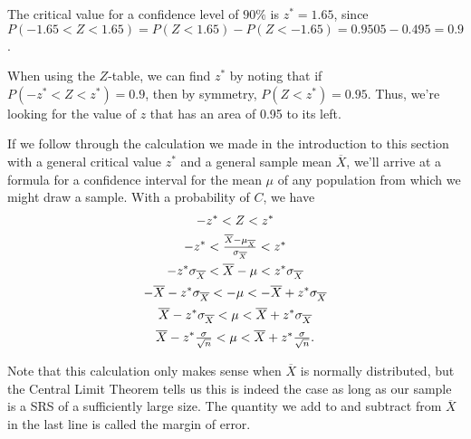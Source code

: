 \begin{examp}
The critical value for a confidence level of $90\%$ is $z^* = 1.65$, since $P(-1.65 < Z < 1.65) = P(Z < 1.65) - P(Z < -1.65) = 0.9505 - 0.495 = 0.9$.
\begin{center}
\end{center}
When using the $Z$-table, we can find $z^*$ by noting that if $P(-z^* < Z < z^*) = 0.9$, then by symmetry, $P(Z < z^*) = 0.95$. Thus, we're looking for the value of $z$ that has an area of 0.95 to its left.
\end{examp}
\par
If we follow through the calculation we made in the introduction to this section with a general critical value $z^*$ and a general sample mean $\overline{X}$, we'll arrive at a formula for a confidence interval for the mean $\mu$ of any population from which we might draw a sample. With a probability of $C$, we have
\begin{gather*}
-z^* < Z < z^* \\
-z^* < \textstyle\frac{\overline{X}- \mu_{\overline{X}}}{\sigma_{\overline{X}}} < z^* \\
-z^* \sigma_{\overline{X}} < \overline{X}- \mu < z^* \sigma_{\overline{X}} \\[0.2ex]
-\overline{X}-z^* \sigma_{\overline{X}} < - \mu < -\overline{X}+z^* \sigma_{\overline{X}} \\[0.3ex]
\overline{X}-z^* \sigma_{\overline{X}} <  \mu < \overline{X}+z^* \sigma_{\overline{X}} \\[0.3ex]
\overline{X}-z^* \textstyle\frac{\sigma}{\sqrt{n}} <  \mu < \overline{X}+z^* 
\frac{\sigma}{\sqrt{n}}.
\end{gather*}
\par
Note that this calculation only makes sense when $\overline{X}$ is normally distributed, but the Central Limit Theorem tells us this is indeed the case as long as our sample is a SRS of a sufficiently large size. The quantity we add to and subtract from $\overline{X}$ in the last line is called the margin of error.
